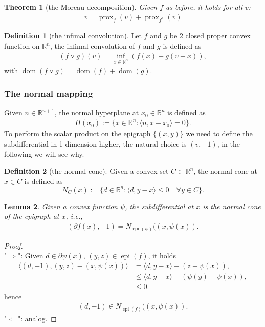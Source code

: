 \documentclass[a4paper,11pt,fleqn, draft]{book}
\newtheorem{theorem}{Theorem}[section]
\newtheorem{lemma}[theorem]{Lemma}
\theoremstyle{definition}
\newtheorem{definition}{Definition}[section]
\theoremstyle{remark}
\DeclareMathOperator{\dom}{dom}
\DeclareMathOperator*{\epi}{epi}
\DeclareMathOperator*{\prox}{prox}
\begin{document}
\begin{theorem}[the Moreau decomposition]
	Given $f$ as before, it holds for all $v$:
	\begin{align*}
		v = \prox_f(v) + \prox_{f^*}(v)
	\end{align*}
\end{theorem}

\begin{definition}[the infimal convolution]
	Let $f$ and $g$ be 2 closed proper convex function on $\mathbb{R}^n$, the infimal convolution of $f$ and $g$ is defined as 
	\begin{align*}
		(f \triangledown g)(v) = \inf_{x \in \mathbb{R}^n}( f(x) + g(v - x)),
	\end{align*}
	with $\dom(f \triangledown g) = \dom(f) + \dom(g)$. 
\end{definition}


\subsubsection{The normal mapping}
Given $n \in \mathbb{R}^{n + 1}$, the normal hyperplane at $x_0 \in \mathbb{R}^n$ is defined as 
\begin{align*}
	H(x_0):= \{ x \in \mathbb{R}^n: \langle n, x - x_0 \rangle = 0\}.
\end{align*}
To perform the scalar product on the epigraph $\{(x, y)\}$ we need to define the subdifferential in 1-dimension higher, the natural choice is $(v, -1)$, in the following we will see why.

\begin{definition}[the normal cone]
Given a convex set $C \subset \mathbb{R}^n$, the normal cone at $x \in C$ is defined as
	\begin{equation}
		N_C(x):= \{ d \in \mathbb{R}^n: \langle d, y - x\rangle \le 0 \quad \forall y 
		\in C \}. 
	\end{equation}
\end{definition}

\begin{lemma}
	Given a convex function $\psi$, the subdifferential at $x$ is the normal cone of the epigraph at $x$, i.e., 
	\begin{align*}
		(\partial f(x), -1) = N_{\epi(\psi)}((x, \psi(x)).
	\end{align*}
\end{lemma}
\begin{proof}
	\quad\\
	"$\Rightarrow$": Given $d \in \partial \psi(x)$, $(y, z) \in \epi(f)$, it holds 
\begin{align*}
	  \langle (d, -1), (y, z) - (x, \psi(x)) \rangle &= \langle d, y - x \rangle - (z - \psi(x)), \\
	  & \le \langle d, y - x\rangle - (\psi(y) - \psi(x)), \\
	  &  \le 0. 
\end{align*}
hence
\begin{align*}
	(d, -1) \in N_{\epi(f)}((x, \psi(x)). 
\end{align*}
"$\Leftarrow$": analog.
\end{proof}
\end{document}
